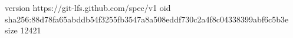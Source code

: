 version https://git-lfs.github.com/spec/v1
oid sha256:88d78fa65abddb54f3255fb3547a8a508eddf730c2a4f8c04338399abf6c5b3e
size 12421
